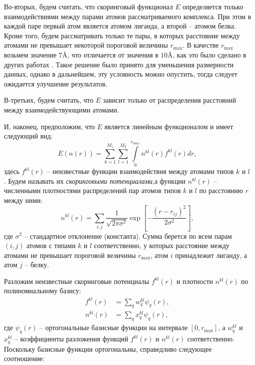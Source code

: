 \documentclass[CEJM,PDF]{Class+Reg_in_Molec_Docking} %
\begin{document}
\hspace{0.5cm}Во-вторых, будем считать, что скоринговый функционал $E$ определяется только взаимодействиями между парами атомов рассматриваемого комплекса. При этом в каждой паре первый атом является атомом лиганда, а второй -- атомом белка. Кроме того, будем рассматривать только те пары, в которых расстояние между атомами не превышает некоторой пороговой величины $r_{\max}$. В качестве $r_{\max}$ возьмем значение $7$\AA, что отличается от значения в $10$\AA, как это было сделано в других работах \cite{rmax1,rmax2,rmax3,rmax4,rmax5,rmax6}. Такое решение было принято для уменьшения размерности данных, однако в дальнейшем, эту условность можно опустить, тогда следует ожидается улучшение результатов. 

\hspace{0.5cm}В-третьих, будем считать, что $E$ зависит только от распределения расстояний между взаимодействующими атомами.

\hspace{0.5cm}И, наконец, предположим, что $E$ является линейным функционалом и имеет следующий вид: 
\begin{equation}\label{eq2}
E(n(r)) = \sum_{k=1}^{M_1}\sum_{l=1}^{M_2}\int\limits_{0}^{r_{max}}n^{kl}(r)f^{kl}(r)dr,
\end{equation}
здесь $f^{kl}(r)$ -- неизвестные функции взаимодействия между атомами типов $k$ и $l$. Будем называть их \textit{скоринговыми потенциалами},а функции $n^{kl}(r)$ -- численными плотностями распределений пар атомов типов $k$ и $l$ по расстоянию $r$ между ними: 
\begin{equation}\label{eq3}
n^{kl}(r) = \sum_{i,j} \frac{1}{\sqrt{2\pi\sigma^2}} \exp\left[{-\frac{(r-r_{ij})^2}{2\sigma^2}}\right],
\end{equation}
где $\sigma^2$ -- стандартное отклонение (константа). Сумма берется по всем парам $(i, j)$ атомов с типами $k$ и $l$ соответственно, у которых расстояние между атомами не превышает пороговой величины $r_{\max}$, атом $i$ принадлежит лиганду, а атом $j$ -- белку.

Разложим неизвестные скоринговые потенциалы $f^{kl}(r)$ и плотности $n^{kl}(r)$ по полиномиальному базису: 
\begin{equation}\label{eq4}
\begin{split}
f^{kl}(r) & = \sum_{q} w_q^{kl}\psi_q(r), \\
n^{kl}(r) & = \sum_{q} x_q^{kl}\psi_q(r),
\end{split}
\end{equation}
где $\psi_q(r)$ -- ортогональные базисные функции на интервале $[0, r_{\max}]$, а $w_q^{kl}$ и $x_q^{kl}$ -- коэффициенты разложения функций $f^{kl}(r)$ и $n^{kl}(r)$ соответственно. Поскольку базисные функции ортогональны, справедливо следующее соотношение:
\end{document}
